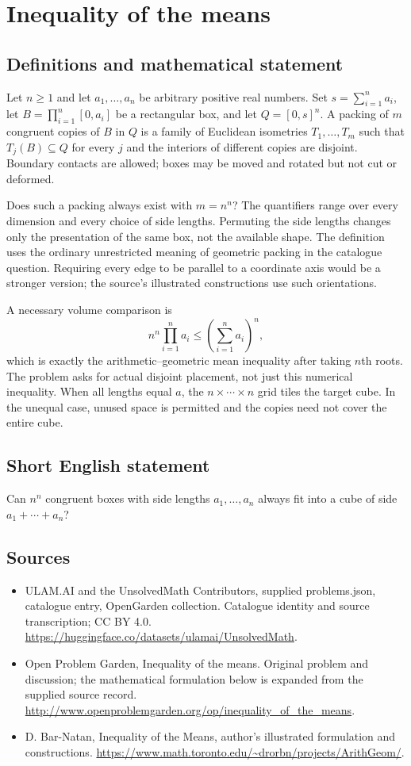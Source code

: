 \documentclass[11pt,a4paper]{article}
\begin{document}
\section*{Inequality of the means}\label{statement}

\subsection{Definitions and mathematical statement}
Let $n\ge1$ and let $a_1,\ldots,a_n$ be arbitrary positive real numbers.
Set $s=\sum_{i=1}^n a_i$, let
$B=\prod_{i=1}^n[0,a_i]$ be a rectangular box, and let $Q=[0,s]^n$.
A packing of $m$ congruent copies of $B$ in $Q$ is a family of Euclidean
isometries $T_1,\ldots,T_m$ such that $T_j(B)\subseteq Q$ for every $j$
and the interiors of different copies are disjoint. Boundary contacts
are allowed; boxes may be moved and rotated but not cut or deformed.

Does such a packing always exist with $m=n^n$? The quantifiers range
over every dimension and every choice of side lengths. Permuting the
side lengths changes only the presentation of the same box, not the
available shape. The definition uses the ordinary unrestricted meaning
of geometric packing in the catalogue question. Requiring every edge to
be parallel to a coordinate axis would be a stronger version; the source's
illustrated constructions use such orientations.

A necessary volume comparison is
\[
 n^n\prod_{i=1}^n a_i\le\left(\sum_{i=1}^n a_i\right)^n,
\]
which is exactly the arithmetic--geometric mean inequality after taking
$n$th roots. The problem asks for actual disjoint placement, not just this
numerical inequality. When all lengths equal $a$, the $n\times\cdots\times n$
grid tiles the target cube. In the unequal case, unused space is permitted
and the copies need not cover the entire cube.
\subsection{Short English statement}
Can $n^n$ congruent boxes with side lengths $a_1,\ldots,a_n$ always fit into a cube of side $a_1+\cdots+a_n$?
\subsection{Sources}
\begin{itemize}
\item[S1] ULAM.AI and the UnsolvedMath Contributors, supplied problems.json, catalogue entry, OpenGarden collection. Catalogue identity and source transcription; CC BY 4.0.
\url{https://huggingface.co/datasets/ulamai/UnsolvedMath}.
\item[S2] Open Problem Garden, Inequality of the means. Original problem and discussion; the mathematical formulation below is expanded from the supplied source record.
\url{http://www.openproblemgarden.org/op/inequality_of_the_means}.
\item[S3] D. Bar-Natan, Inequality of the Means, author’s illustrated formulation and constructions.
\url{https://www.math.toronto.edu/~drorbn/projects/ArithGeom/}.
\end{itemize}
\end{document}
